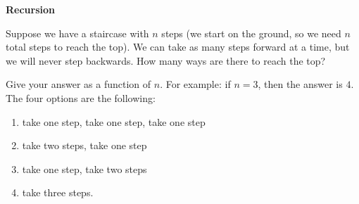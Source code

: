 \item {} {\bf Recursion}

Suppose we have a staircase with $n$ steps (we start on the ground, so we need
$n$ total steps to reach the top). We can take as many steps forward at a time,
but we will never step backwards. How many ways are there to reach the top?

Give your answer as a function of $n$. For example: if $n = 3$, then the answer is $4$. The four options are the following:
\begin{enumerate}[noitemsep, topsep=0pt,label=\arabic*)]
\item take one step, take one step, take one step
\item take two steps, take one step
\item take one step, take two steps
\item take three steps.
\end{enumerate}
